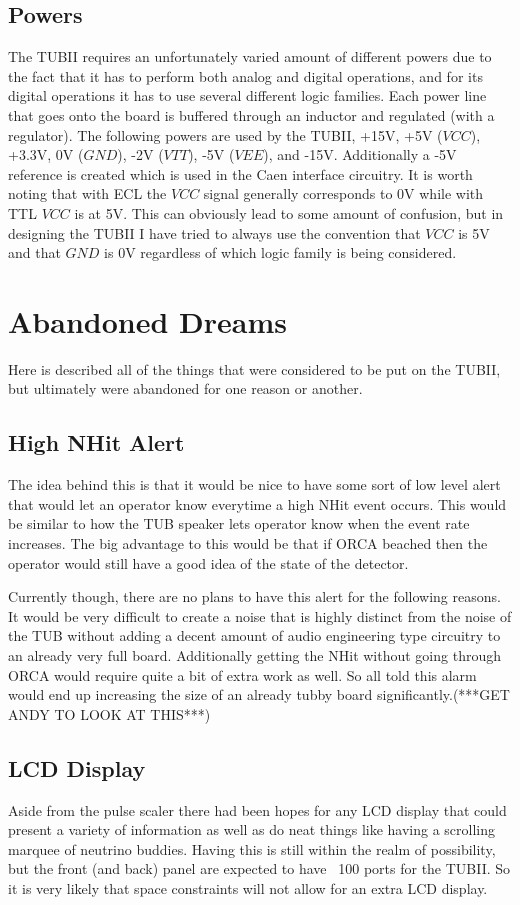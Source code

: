 \documentclass[11pt,a4paper]{article}
\begin{document}
\subsection{Powers}
The TUBII requires an unfortunately varied amount of different powers due to the fact that it has to perform both analog and digital operations, and for its digital operations it has to use several different logic families. Each power line that goes onto the board is buffered through an inductor and regulated (with a regulator). The following powers are used by the TUBII, +15V, +5V ($VCC$), +3.3V, 0V ($GND$), -2V ($VTT$), -5V ($VEE$), and -15V. Additionally a -5V reference is created which is used in the Caen interface circuitry. It is worth noting that with ECL the $VCC$ signal generally corresponds to 0V while with TTL $VCC$ is at 5V. This can obviously lead to some amount of confusion, but in designing the TUBII I have tried to always use the convention that $VCC$ is 5V and that $GND$ is 0V regardless of which logic family is being considered.

\section{Abandoned Dreams}
Here is described all of the things that were considered to be put on the TUBII, but ultimately were abandoned for one reason or another.
\subsection{High NHit Alert}
The idea behind this is that it would be nice to have some sort of low level alert that would let an operator know everytime a high NHit event occurs. This would be similar to how the TUB speaker lets operator know when the event rate increases. The big advantage to this would be that if ORCA beached then the operator would still have a good idea of the state of the detector.

Currently though, there are no plans to have this alert for the following reasons. It would be very difficult to create a noise that is highly distinct from the noise of the TUB without adding a decent amount of audio engineering type circuitry to an already very full board. Additionally getting the NHit without going through ORCA would require quite a bit of extra work as well. So all told this alarm would end up increasing the size of an already tubby board significantly.(***GET ANDY TO LOOK AT THIS***)

\subsection{LCD Display}
Aside from the pulse scaler there had been hopes for any LCD display that could present a variety of information as well as do neat things like having a scrolling marquee of neutrino buddies. Having this is still within the realm of possibility, but the front (and back) panel are expected to have ~100 ports for the TUBII. So it is very likely that space constraints will not allow for an extra LCD display.
\end{document}
